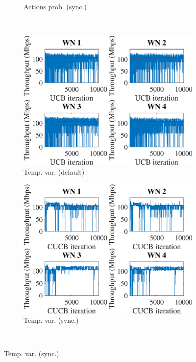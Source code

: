 \documentclass[preprint,12pt]{article}
\begin{document}
\begin{figure}[h!]
\begin{subfigure}[b]{.3\textwidth}
		\caption{Actions prob. (sync.)}\label{fig:hist_actions_CUCB}
	\end{subfigure}\\
	\begin{subfigure}[b]{.3\textwidth}
		\includegraphics[width=\textwidth]{images/temporal_individual_tpt_UCB}
		\caption{Temp. var.  (default)}\label{fig:temporal_individual_tpt_UCB}
	\end{subfigure}
	\begin{subfigure}[b]{.3\textwidth}
		\includegraphics[width=\textwidth]{images/temporal_individual_tpt_CUCB}
		\caption{Temp. var.  (sync.)}\label{fig:temporal_individual_tpt_CUCB}
	\end{subfigure}\\

\end{figure}
\end{document}
